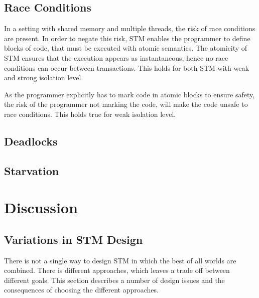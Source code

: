\subsection{Race Conditions}
In a setting with shared memory and multiple threads, the risk of race conditions are present. In order to negate this risk, \ac{STM} enables the programmer to define blocks of code, that must be executed with atomic semantics. The atomicity of \ac{STM} ensures that the execution appears as instantaneous, hence no race conditions can occur between transactions. This holds for both \ac{STM} with weak and strong isolation level.

As the programmer explicitly has to mark code in atomic blocks to ensure safety, the risk of the programmer not marking the code, will make the code unsafe to race conditions. This holds true for weak isolation level.




\subsection{Deadlocks}

\subsection{Starvation}


\section{Discussion}
\label{sec:stm_discussion}
\subsection{Variations in \ac{STM} Design}
There is not a single way to design \ac{STM} in which the best of all worlds are combined. There is different approaches, which leaves a trade off between different goals. This section describes a number of design issues and the consequences of choosing the different approaches.

